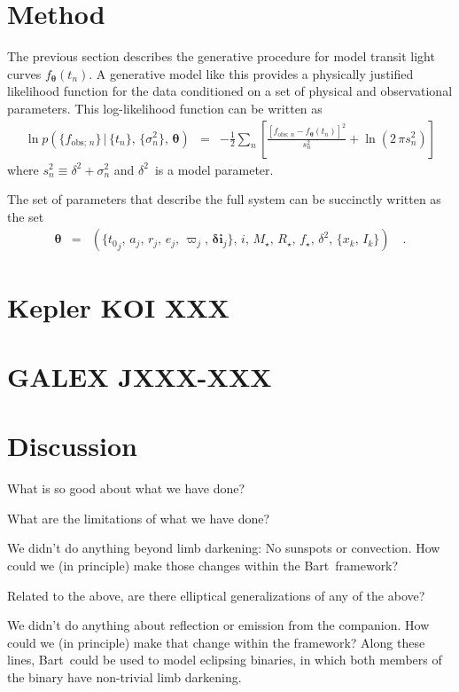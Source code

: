 \documentclass[12pt,preprint]{aastex}
\newcommand{\project}[1]{{\sffamily #1}}
\newcommand{\bart}{\project{Bart}}
\newcommand{\bvec}[1]{\ensuremath{\boldsymbol{#1}}}
\newcommand{\pr}[1]{\ensuremath{p (#1)}}
\newcommand{\setof}[1]{\ensuremath{\{ #1 \}}}
\newcommand{\model}{\ensuremath{\bvec{\theta}}}
\newcommand{\tobs}{\ensuremath{t_n}}
\newcommand{\fmodel}{\ensuremath{f_{\model} (\tobs)}}
\newcommand{\fobs}{\ensuremath{f_{\mathrm{obs};\,n}}}
\newcommand{\ferr}{\ensuremath{\sigma_n^2}}
\newcommand{\fullerr}{\ensuremath{s_n^2}}
\newcommand{\rstar}{\ensuremath{R_\star}}
\newcommand{\rplanet}{\ensuremath{r}}
\newcommand{\rsurface}{\ensuremath{x}}
\newcommand{\tzero}{\ensuremath{{t_0}}}
\newcommand{\smaxis}{\ensuremath{a}}
\newcommand{\ecc}{\ensuremath{e}}
\newcommand{\pomega}{\ensuremath{\varpi}}
\newcommand{\incl}{\ensuremath{\bvec{\delta i}}}
\newcommand{\jitter}{\ensuremath{\delta^2}}
\newcommand{\mstar}{\ensuremath{M_\star}}
\newcommand{\fstar}{\ensuremath{f_\star}}
\newcommand{\iobs}{\ensuremath{i}}
\begin{document}
\section{Method}

The previous section describes the generative procedure for model transit
light curves \fmodel.
A generative model like this provides a physically justified likelihood
function for the data conditioned on a set of physical and observational
parameters.
This log-likelihood function can be written as
\begin{eqnarray}
    \ln \pr{\setof{\fobs}\,|\,\setof{\tobs},\,\setof{\ferr},\,\model}
    & = & -\frac{1}{2} \sum_{n} \left [ \frac{[\fobs - \fmodel]^2}{\fullerr}
+ \ln \left ( 2\,\pi\fullerr \right ) \right ]
\end{eqnarray}
where $\fullerr \equiv \jitter + \ferr$ and \jitter\ is a model parameter.

The set of parameters that describe the full system can be succinctly written
as the set
\begin{eqnarray}
    \model & = & \left (
        \setof{\tzero_j,\,\smaxis_j,\,\rplanet_j,\,\ecc_j,\,\pomega_j,\,
        \incl_j},\,\iobs,\,\mstar,\,\rstar,\,\fstar,\,\jitter,\,
        \setof{\rsurface_k,\,I_k}
    \right ) \quad.
\end{eqnarray}


\section{Kepler KOI XXX}

\section{GALEX JXXX-XXX}

\section{Discussion}

What is so good about what we have done?

What are the limitations of what we have done?

We didn't do anything beyond limb darkening:  No sunspots or convection.
How could we (in principle) make those changes within the \bart\ framework?

Related to the above, are there elliptical generalizations of any of the above?

We didn't do anything about reflection or emission from the companion.
How could we (in principle) make that change within the framework?
Along these lines, \bart\ could be used to model eclipsing binaries,
in which both members of the binary have non-trivial limb darkening.
\end{document}
